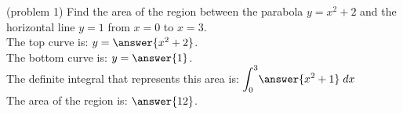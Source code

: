 \documentclass[handout]{ximera}
\begin{document}
\begin{example}[example 1]
\begin{center}
\begin{image}
\end{image}
\end{center}

\end{example}




\begin{problem}(problem 1)
Find the area of the region between the parabola $y = x^2 + 2$ and the horizontal line $y =1$ from $x = 0$ to $x = 3$.\\
The top curve is: $y = \answer{x^2 + 2}$.\\
The bottom curve is: $y = \answer{1}$.\\
The definite integral that represents this area is: $\displaystyle{\int_0^{3}} \answer{x^2 + 1} \; dx$\\
The area of the region is: $\answer{12}$.
\end{problem}
\end{document}
